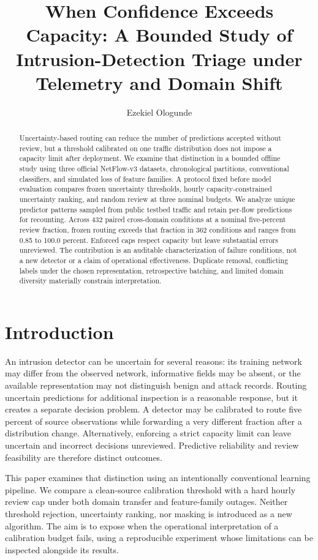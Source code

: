 \documentclass[manuscript,screen,nonacm]{acmart}
\title{When Confidence Exceeds Capacity: A Bounded Study of Intrusion-Detection Triage under Telemetry and Domain Shift}
\author{Ezekiel Ologunde}
\affiliation[obeypunctuation=true]{\institution{Independent Researcher}\country{}}
\begin{document}
\begin{abstract}
Uncertainty-based routing can reduce the number of predictions accepted without review, but a threshold calibrated on one traffic distribution does not impose a capacity limit after deployment. We examine that distinction in a bounded offline study using three official NetFlow-v3 datasets, chronological partitions, conventional classifiers, and simulated loss of feature families. A protocol fixed before model evaluation compares frozen uncertainty thresholds, hourly capacity-constrained uncertainty ranking, and random review at three nominal budgets. We analyze unique predictor patterns sampled from public testbed traffic and retain per-flow predictions for recounting. Across 432 paired cross-domain conditions at a nominal five-percent review fraction, frozen routing exceeds that fraction in 362 conditions and ranges from 0.85 to 100.0 percent. Enforced caps respect capacity but leave substantial errors unreviewed.
The contribution is an auditable characterization of failure conditions, not a new detector or a claim of operational effectiveness. Duplicate removal, conflicting labels under the chosen representation, retrospective batching, and limited domain diversity materially constrain interpretation.
\end{abstract}
\maketitle

\section{Introduction}
An intrusion detector can be uncertain for several reasons: its training network may differ from the observed network, informative fields may be absent, or the available representation may not distinguish benign and attack records. Routing uncertain predictions for additional inspection is a reasonable response, but it creates a separate decision problem. A detector may be calibrated to route five percent of source observations while forwarding a very different fraction after a distribution change. Alternatively, enforcing a strict capacity limit can leave uncertain and incorrect decisions unreviewed. Predictive reliability and review feasibility are therefore distinct outcomes.

This paper examines that distinction using an intentionally conventional learning pipeline. We compare a clean-source calibration threshold with a hard hourly review cap under both domain transfer and feature-family outages. Neither threshold rejection, uncertainty ranking, nor masking is introduced as a new algorithm. The aim is to expose when the operational interpretation of a calibration budget fails, using a reproducible experiment whose limitations can be inspected alongside its results.
\end{document}
